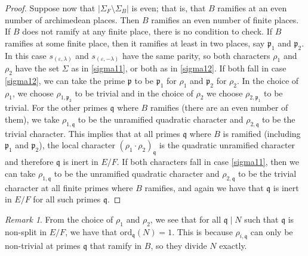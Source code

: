 \documentclass{amsart}
\theoremstyle{definition}
\theoremstyle{remark}
\newtheorem{remark}[theorem]{Remark}
\numberwithin{equation}{section}
\newcommand{\ord}{\mathrm{ord}}
\newcommand{\fp}{{\mathfrak{p}}}
\newcommand{\fq}{{\mathfrak{q}}}
\begin{document}
\begin{proof}
  Suppose now that $|\Sigma_F\setminus\Sigma_B|$ is even; that is, that $B$ ramifies at an even number of archimedean places. Then $B$ ramifies an even number of finite places. If $B$ does not ramify at any finite place, there is no condition to check. If $B$ ramifies at some finite place, then it ramifies at least in two places, say $\fp_1$ and $\fp_2$. In this case $s_{(\varepsilon,\lambda)}$ and $s_{(\varepsilon,-\lambda)}$ have the same parity, so both characters $\rho_1$ and $\rho_2$  have the set $\Sigma$ as in \eqref{sigma11}, or both as in \eqref{sigma12}. If both fall in case \eqref{sigma12}, we can take the prime $\fp$ to be $\fp_1$ for $\rho_1$ and $\fp_2$ for $\rho_2$. In the choice of $\rho_1$, we choose $\rho_{1,\fp_2}$ to be trivial and in the choice of $\rho_2$ we choose $\rho_{2,\fp_1}$ to be trivial. For the other primes $\fq$ where $B$ ramifies (there are an even number of them), we take $\rho_{1,\fq}$ to be the unramified quadratic character and $\rho_{2,\fq}$ to be the trivial character. This implies that at all primes $\fq$ where $B$ is ramified (including $\fp_1$ and $\fp_2$), the local character $(\rho_1\cdot\rho_2)_\fq$ is the quadratic unramified character and therefore $\fq$ is inert in $E/F$. If both characters fall in case \eqref{sigma11}, then we can take $\rho_{1,\fq}$ to be the unramified quadratic character and $\rho_{2,\fq}$ to be the trivial character at all finite primes where $B$ ramifies, and again we have that $\fq$ is inert in $E/F$ for all such primes $\fq$.
\end{proof}
\begin{remark}\label{rk:ass}
  From the choice of $\rho_1$ and $\rho_2$, we see that for all $\fq\mid N$ such that $\fq$ is non-split in $E/F$, we have that $\ord_\fq(N)=1$. This is because $\rho_{i,\fq}$ can only be non-trivial at primes $\fq$ that ramify in $B$, so they divide $N$ exactly.
\end{remark}


\end{document}
